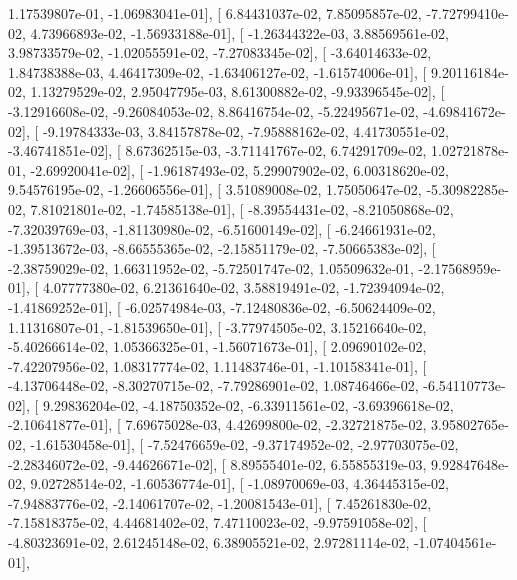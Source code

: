 \documentclass{article}
\begin{document}
          1.17539807e-01,  -1.06983041e-01],
       [  6.84431037e-02,   7.85095857e-02,  -7.72799410e-02,
          4.73966893e-02,  -1.56933188e-01],
       [ -1.26344322e-03,   3.88569561e-02,   3.98733579e-02,
         -1.02055591e-02,  -7.27083345e-02],
       [ -3.64014633e-02,   1.84738388e-03,   4.46417309e-02,
         -1.63406127e-02,  -1.61574006e-01],
       [  9.20116184e-02,   1.13279529e-02,   2.95047795e-03,
          8.61300882e-02,  -9.93396545e-02],
       [ -3.12916608e-02,  -9.26084053e-02,   8.86416754e-02,
         -5.22495671e-02,  -4.69841672e-02],
       [ -9.19784333e-03,   3.84157878e-02,  -7.95888162e-02,
          4.41730551e-02,  -3.46741851e-02],
       [  8.67362515e-03,  -3.71141767e-02,   6.74291709e-02,
          1.02721878e-01,  -2.69920041e-02],
       [ -1.96187493e-02,   5.29907902e-02,   6.00318620e-02,
          9.54576195e-02,  -1.26606556e-01],
       [  3.51089008e-02,   1.75050647e-02,  -5.30982285e-02,
          7.81021801e-02,  -1.74585138e-01],
       [ -8.39554431e-02,  -8.21050868e-02,  -7.32039769e-03,
         -1.81130980e-02,  -6.51600149e-02],
       [ -6.24661931e-02,  -1.39513672e-03,  -8.66555365e-02,
         -2.15851179e-02,  -7.50665383e-02],
       [ -2.38759029e-02,   1.66311952e-02,  -5.72501747e-02,
          1.05509632e-01,  -2.17568959e-01],
       [  4.07777380e-02,   6.21361640e-02,   3.58819491e-02,
         -1.72394094e-02,  -1.41869252e-01],
       [ -6.02574984e-03,  -7.12480836e-02,  -6.50624409e-02,
          1.11316807e-01,  -1.81539650e-01],
       [ -3.77974505e-02,   3.15216640e-02,  -5.40266614e-02,
          1.05366325e-01,  -1.56071673e-01],
       [  2.09690102e-02,  -7.42207956e-02,   1.08317774e-02,
          1.11483746e-01,  -1.10158341e-01],
       [ -4.13706448e-02,  -8.30270715e-02,  -7.79286901e-02,
          1.08746466e-02,  -6.54110773e-02],
       [  9.29836204e-02,  -4.18750352e-02,  -6.33911561e-02,
         -3.69396618e-02,  -2.10641877e-01],
       [  7.69675028e-03,   4.42699800e-02,  -2.32721875e-02,
          3.95802765e-02,  -1.61530458e-01],
       [ -7.52476659e-02,  -9.37174952e-02,  -2.97703075e-02,
         -2.28346072e-02,  -9.44626671e-02],
       [  8.89555401e-02,   6.55855319e-03,   9.92847648e-02,
          9.02728514e-02,  -1.60536774e-01],
       [ -1.08970069e-03,   4.36445315e-02,  -7.94883776e-02,
         -2.14061707e-02,  -1.20081543e-01],
       [  7.45261830e-02,  -7.15818375e-02,   4.44681402e-02,
          7.47110023e-02,  -9.97591058e-02],
       [ -4.80323691e-02,   2.61245148e-02,   6.38905521e-02,
          2.97281114e-02,  -1.07404561e-01],
\end{document}
